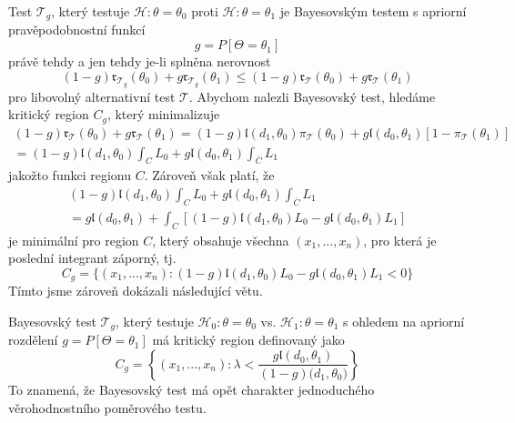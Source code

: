 \begin{definition}
Test $\mathscr{T}_g$, který testuje $\mathscr{H}: \theta = \theta_0$ proti $\mathscr{H}: \theta = \theta_1$ je Bayesovským testem s apriorní pravěpodobnostní funkcí
\begin{equation*}
g = P[\Theta = \theta_1]
\end{equation*}
právě tehdy a jen tehdy je-li splněna nerovnost
\begin{equation*}
(1 - g)\mathfrak{r}_{\mathscr{T}_g}(\theta_0) + g \mathfrak{r}_{\mathscr{T}_g}(\theta_1) \le (1 - g)\mathfrak{r}_{\mathscr{T}}(\theta_0) + g \mathfrak{r}_{\mathscr{T}}(\theta_1)
\end{equation*}
pro libovolný alternativní test $\mathscr{T}$. Abychom nalezli Bayesovský test, hledáme kritický region $C_g$, který minimalizuje
\begin{multline*}
(1 - g)\mathfrak{r}_{\mathscr{T}}(\theta_0) + g \mathfrak{r}_{\mathscr{T}}(\theta_1) = (1 - g)\mathfrak{l}(d_1, \theta_0)\pi_{\mathscr{T}}(\theta_0) + g \mathfrak{l}(d_0, \theta_1)[1 - \pi_{\mathscr{T}}(\theta_1)]\\
= (1 - g)\mathfrak{l}(d_1, \theta_0) \int_C L_0 + g \mathfrak{l}(d_0, \theta_1) \int_{\overline{C}}L_1
\end{multline*}
jakožto funkci regionu $C$. Zároveň však platí, že
\begin{multline*}
(1 - g)\mathfrak{l}(d_1, \theta_0)\int_C L_0 + g \mathfrak{l}(d_0, \theta_1) \int_{\overline{C}}L_1\\
= g \mathfrak{l}(d_0, \theta_1) + \int_C[(1 - g)\mathfrak{l}(d_1, \theta_0)L_0 - g \mathfrak{l}(d_0, \theta_1)L_1]
\end{multline*}
je minimální pro region $C$, který obsahuje všechna $(x_1, ..., x_n)$, pro která je poslední integrant záporný, tj.
\begin{equation*}
C_g = \{(x_1, ..., x_n): (1 - g)\mathfrak{l}(d_1, \theta_0)L_0 - g \mathfrak{l}(d_0, \theta_1)L_1 < 0\}
\end{equation*}
Tímto jsme zároveň dokázali následující větu.
\end{definition}

\begin{theorem}
Bayesovský test $\mathscr{T}_g$, který testuje $\mathscr{H}_0: \theta = \theta_0$ vs. $\mathscr{H}_1: \theta = \theta_1$ s ohledem na apriorní rozdělení $g = P[\Theta = \theta_1]$ má kritický region definovaný jako
\begin{equation*}
C_g = \left\{(x_1, ..., x_n): \lambda < \frac{g \mathfrak{l}(d_0, \theta_1)}{(1 - g)\mathfrak(d_1, \theta_0)}\right\}
\end{equation*}
To znamená, že Bayesovský test má opět charakter jednoduchého věrohodnostního poměrového testu.
\end{theorem}

